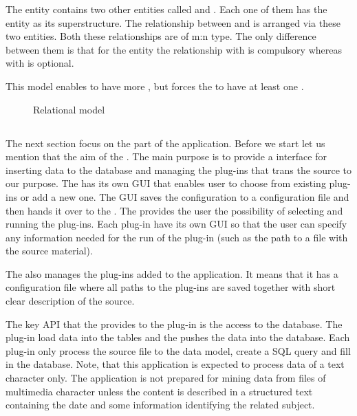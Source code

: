 The entity  contains two other entities called  and . Each one of them has the entity  as its superstructure. The relationship between  and  is arranged via these two entities. Both these relationships are of m:n type. The only difference between them is that  for the  entity the relationship with  is compulsory whereas with  is optional. 

This model enables  to have more , but forces the  to have at least one .


\begin{figure}[!h]
    \centering 
    
    \epsfysize=180mm 
    \caption{Relational model}\label{Relational}
\end{figure}

\subsection{} 

The next section focus on the  part of the application. Before we start let us mention that the aim of the . The main purpose is to provide a interface for inserting data to the database and managing the plug-ins that trans the source to our purpose. The  has its own GUI that enables user to choose from existing plug-ins or add a new one. The GUI saves the configuration to a configuration file and then hands it over to the . The  provides the user the possibility of selecting and running the plug-ins. Each plug-in have its own GUI so that the user can specify any information needed for the run of the plug-in (such as the path to a file with the source material). 

The  also manages the plug-ins added to the application. It means that it has a configuration file where all paths to the plug-ins are saved together with short clear description of the source. %

The key API that the  provides to the plug-in is the access to the database. %
The plug-in load data into the tables and the  pushes the data into the database. Each plug-in only process the source file to the data model, create a SQL query and fill in the database. Note, that this application is expected to process data of a text character only. The application is not prepared for mining data from files of multimedia character unless the content is described in a structured text containing the date and some information identifying the related subject.

